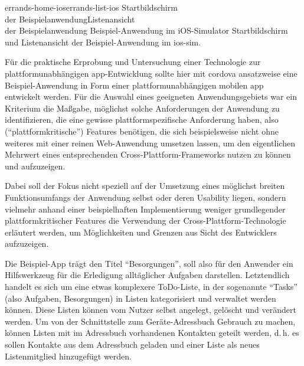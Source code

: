 
	{errands-home-ios}{errands-list-ios}
	{Startbildschirm \\ der Beispielanwendung}{Listenansicht \\der Beispielanwendung}
	{Beispiel-Anwendung im iOS-Simulator}
	{Startbildschirm und Listenansicht der Beispiel-Anwendung im \gls{ios-sim}.}
	{\ownScreenshot}

Für die praktische Erprobung und Untersuchung einer Technologie zur plattformunabhängigen \gls{app}-Entwicklung sollte hier mit \gls{cordova} ansatzweise eine Beispiel-Anwendung in Form einer plattformunabhängigen mobilen \gls{app} entwickelt werden.
Für die Auswahl eines geeigneten Anwendungsgebiets war ein Kriterium die Maßgabe, möglichst solche Anforderungen der Anwendung zu identifizieren, die eine gewisse plattformspezifische Anforderung haben, also (\enquote{plattformkritische}) Features benötigen, die sich beispielsweise nicht ohne weiteres mit einer reinen Web-Anwendung umsetzen lassen, um den eigentlichen Mehrwert eines entsprechenden Cross-Plattform-Frameworks nutzen zu können und aufzuzeigen.

Dabei soll der Fokus nicht speziell auf der Umsetzung eines möglichst breiten Funktionsumfangs der Anwendung selbst oder deren Usability liegen, sondern vielmehr anhand einer beispielhaften Implementierung weniger grundlegender plattformkritischer Features die Verwendung der Cross-Plattform-Technologie erläutert werden, um Möglichkeiten und Grenzen aus Sicht des Entwicklers aufzuzeigen.

Die Beispiel-App trägt den Titel \enquote{Besorgungen}, soll also für den Anwender ein Hilfswerkzeug für die Erledigung alltäglicher Aufgaben darstellen.
Letztendlich handelt es sich um eine etwas komplexere ToDo-Liste, in der sogenannte \enquote{Tasks} (also Aufgaben, Besorgungen) in Listen kategorisiert und verwaltet werden können.
Diese Listen können vom Nutzer selbst angelegt, gelöscht und verändert werden.
Um von der Schnittstelle zum Geräte-Adressbuch Gebrauch zu machen, können Listen mit im Adressbuch vorhandenen Kontakten geteilt werden, d.\,h. es sollen Kontakte aus dem Adressbuch geladen und einer Liste als neues Listenmitglied hinzugefügt werden.

